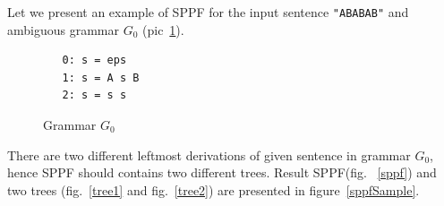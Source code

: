 Let we present an example of SPPF for the input sentence \verb|"ABABAB"| and ambiguous grammar $G_0$ (pic~\ref{grammarG0}).

\begin{figure}[h]
   \begin{center}
\begin{verbatim}
   0: s = eps
   1: s = A s B
   2: s = s s
\end{verbatim}
   \caption{Grammar $G_0$}
   \label{grammarG0}        
   \end{center}
\end{figure}


There are two different leftmost derivations of given sentence in grammar $G_0$, hence SPPF should contains two different trees. Result SPPF(fig. ~\ref{sppf}) and two trees (fig.~\ref{tree1} and fig.~\ref{tree2}) are presented in figure~\ref{sppfSample}. 
 
